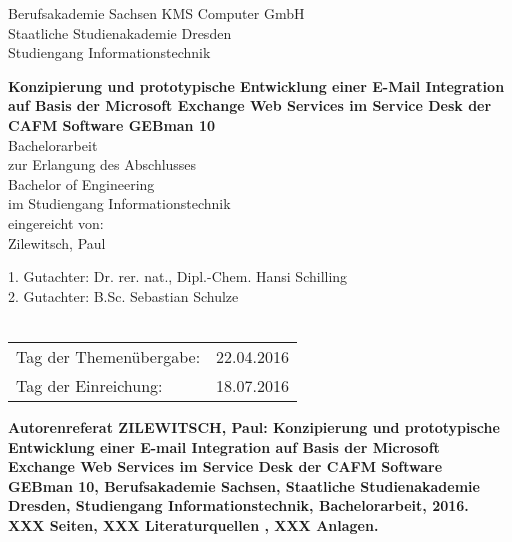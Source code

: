 \documentclass[fontsize=12pt]{scrartcl}
\begin{document}
\thispagestyle{empty}
\large
	\noindent Berufsakademie Sachsen \hfill KMS Computer GmbH\\
	Staatliche Studienakademie Dresden \\
	Studiengang Informationstechnik
\begin{center}	
	\vspace*{4cm}
	\textbf{Konzipierung und prototypische Entwicklung einer E-Mail Integration auf Basis der Microsoft Exchange Web Services im Service Desk der CAFM Software GEBman 10}\\
	\vspace*{2cm}
		Bachelorarbeit\\ zur Erlangung des Abschlusses\\ Bachelor of Engineering\\ im Studiengang 						Informationstechnik\\
	\vspace*{2cm}
	eingereicht von:\\Zilewitsch, Paul
	\vspace*{3cm}
\end{center}
	1. Gutachter: Dr. rer. nat., Dipl.-Chem. Hansi Schilling\\
	2. Gutachter: B.Sc. Sebastian Schulze 
	\\\\
	\begin{tabular}{@{}ll}
		Tag der Themenübergabe:&22.04.2016\\
		Tag der Einreichung:&18.07.2016
	\end{tabular}
\pagebreak





\noindent
\Large\bfseries
Autorenreferat
\normalsize\mdseries
\thispagestyle{empty}
\newline\newline
\noindent
ZILEWITSCH, Paul: Konzipierung und prototypische Entwicklung einer E-mail Integration auf Basis der Microsoft Exchange Web Services im Service Desk der CAFM Software GEBman 10,  Berufsakademie Sachsen, Staatliche Studienakademie Dresden, Studiengang Informationstechnik, Bachelorarbeit, 2016.\\ 
XXX Seiten, XXX Literaturquellen , XXX Anlagen. 
\newpage
\end{document}

